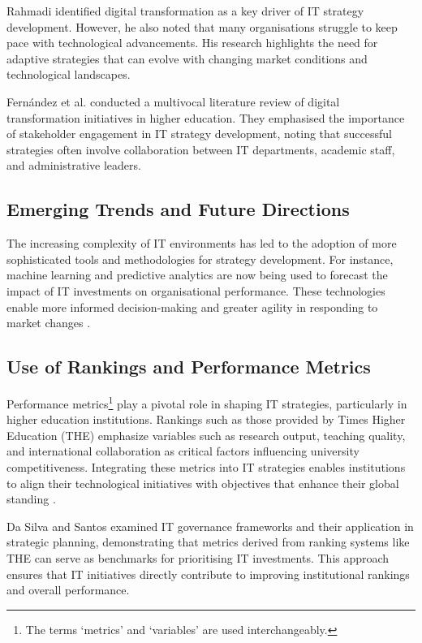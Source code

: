 \documentclass[conference]{IEEEtran}
\begin{document}
Rahmadi \cite{rahmadi2024research} identified digital transformation as a key driver of IT strategy development. However, he also noted that many organisations struggle to keep pace with technological advancements. His research highlights the need for adaptive strategies that can evolve with changing market conditions and technological landscapes.

Fernández et al. \cite{fernandez2023digital} conducted a multivocal literature review of digital transformation initiatives in higher education. They emphasised the importance of stakeholder engagement in IT strategy development, noting that successful strategies often involve collaboration between IT departments, academic staff, and administrative leaders.

\subsection{Emerging Trends and Future Directions}

The increasing complexity of IT environments has led to the adoption of more sophisticated tools and methodologies for strategy development. For instance, machine learning and predictive analytics are now being used to forecast the impact of IT investments on organisational performance. These technologies enable more informed decision-making and greater agility in responding to market changes \cite{digitalsystems2022strategy}.


\subsection{Use of Rankings and Performance Metrics}

Performance metrics\footnote{The terms `metrics' and `variables' are used interchangeably.} play a pivotal role in shaping IT strategies, particularly in higher education institutions. Rankings such as those provided by Times Higher Education (THE) emphasize variables such as research output, teaching quality, and international collaboration as critical factors influencing university competitiveness. Integrating these metrics into IT strategies enables institutions to align their technological initiatives with objectives that enhance their global standing \cite{times2023methodology}.

Da Silva and Santos \cite{dasilva2014cobit} examined IT governance frameworks and their application in strategic planning, demonstrating that metrics derived from ranking systems like THE can serve as benchmarks for prioritising IT investments. This approach ensures that IT initiatives directly contribute to improving institutional rankings and overall performance.
\end{document}
